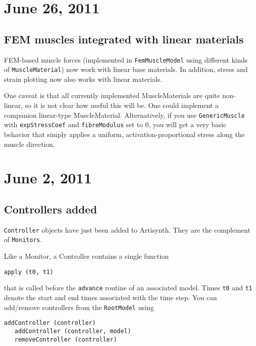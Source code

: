 \documentclass{article}
\begin{document}
\section*{June 26, 2011}

\subsection*{FEM muscles integrated with linear materials}

FEM-based muscle forces (implemented in {\tt FemMuscleModel} using
different kinds of {\tt MuscleMaterial}) now work with linear base
materials. In addition, stress and strain plotting now also works with
linear materials.

One caveat is that all currently implemented MuscleMaterials are quite
non-linear, so it is not clear how useful this will be.  One could
implement a companion linear-type MuscleMaterial.  Alternatively, if
you use {\tt GenericMuscle} with {\tt expStressCoef} and {\tt fibreModulus} set to
0, you will get a very basic behavior that simply applies a uniform,
activation-proportional stress along the muscle direction.

\section*{June 2, 2011}

\subsection*{Controllers added}

{\tt Controller} objects have just been added to Artisynth. They are the
complement of {\tt Monitors}. 

Like a Monitor, a Controller contains a single function 

\begin{lstlisting}[]
   apply (t0, t1)
\end{lstlisting}

that is called before the {\tt advance} routine of an associated model.
Times {\tt t0} and {\tt t1} denote the start and end times associated with the
time step. You can add/remove controllers from the {\tt RootModel}
using 

\begin{lstlisting}[]
   addController (controller)
   addController (controller, model)
   removeController (controller)
\end{lstlisting}
\end{document}
